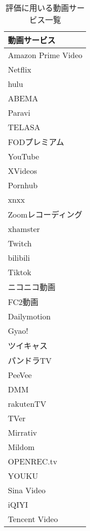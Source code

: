 \begin{table}[htbp]
  \label{tb:evl-video-service-list}
  \caption{評価に用いる動画サービス一覧}
  \begin{center}
    \begin{tabular}{|l|}
    \hline
    動画サービス  \\\hline\hline
    Amazon Prime Video \\ \hline
    Netflix \\ \hline
    hulu \\ \hline
    ABEMA \\ \hline
    Paravi \\ \hline
    TELASA \\ \hline
    FODプレミアム \\ \hline
    YouTube \\ \hline
    XVideos \\ \hline
    Pornhub \\ \hline
    xnxx \\ \hline
    Zoomレコーディング \\ \hline
    xhamster \\ \hline
    Twitch \\ \hline
    bilibili \\ \hline
    Tiktok \\ \hline
    ニコニコ動画 \\ \hline
    FC2動画 \\ \hline
    Dailymotion \\ \hline
    Gyao! \\ \hline
    ツイキャス \\ \hline
    パンドラTV \\ \hline
    PeeVee \\ \hline
    DMM \\ \hline
    rakutenTV \\ \hline
    TVer \\ \hline
    Mirrativ \\ \hline
    Mildom \\ \hline
    OPENREC.tv \\ \hline
    YOUKU \\ \hline
    Sina Video \\ \hline
    iQIYI \\ \hline
    Tencent Video \\ \hline
    \end{tabular}
  \end{center}
\end{table}

